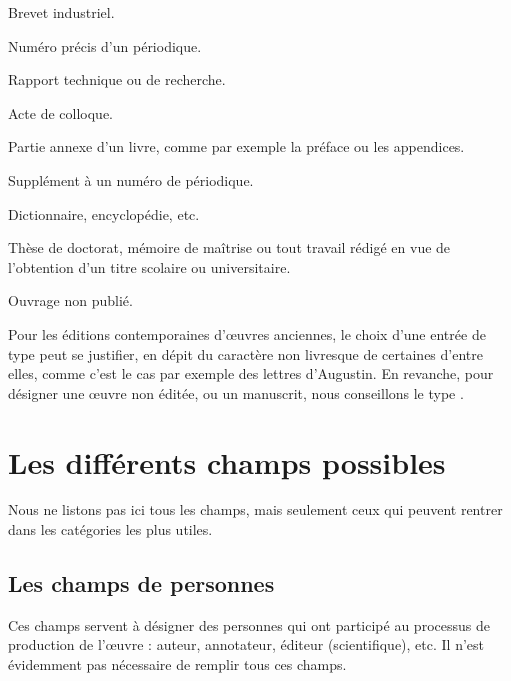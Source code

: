 \begin{choix}
	\item[\type{patent}]
	Brevet industriel.
	\item[\type{periodical}]
	Numéro précis d'un périodique.	
	\item[\type{report}]	
	Rapport technique ou de recherche.
	\item[\type{proceedings}]
	Acte de colloque.
	\item[\type{suppbook}]
	Partie annexe d'un livre, comme par exemple la préface ou les appendices.
	\item[\type{supperiodical}]
	Supplément à un numéro de périodique.
	\item[\type{reference}]
	Dictionnaire, encyclopédie, etc.
	\item[\type{thesis}]
	Thèse de doctorat, mémoire de maîtrise ou tout travail rédigé en vue de l'obtention d'un titre scolaire ou universitaire.
	\item[\type{unpublished}]
	Ouvrage non publié.
\end{choix}

Pour les éditions contemporaines d'œuvres anciennes, le choix d'une entrée de type  peut se justifier, en dépit du caractère non livresque de certaines d'entre elles, comme c'est le cas par exemple des lettres d'Augustin. En revanche, pour désigner  une œuvre non éditée, ou un manuscrit, nous conseillons le type .

\section{Les différents champs possibles}

Nous ne listons pas ici tous les champs, mais seulement ceux qui peuvent rentrer dans les catégories les plus utiles.
\subsection{Les champs de personnes}

Ces champs servent à désigner des personnes qui ont participé au processus de production de l'œuvre : auteur, annotateur, éditeur (scientifique), etc. Il n'est évidemment pas nécessaire de remplir tous ces champs.

